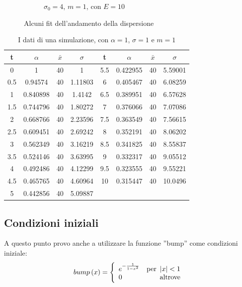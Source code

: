 \begin{figure}[ht]
\begin{subfigure}[b]{0.3\textwidth}
		\caption{$\sigma_0=4$, $m=1$, con $E=10$}
	\end{subfigure}
	\caption{Alcuni fit dell'andamento della dispersione}\label{fig:dispersioneFitE}
\end{figure}

\begin{table}
	\centering
\begin{tabular}{cccc|cccc}
	\toprule
	t	&$\alpha$	&$\bar x$& $\sigma$ &	t	&	$\alpha$	&$\bar x$& $\sigma$\\ \toprule
	0   & 1        & 40 & 1       & 5.5 & 0.422955 & 40 & 5.59001 \\ \midrule
	0.5 & 0.94574  & 40 & 1.11803 & 6   & 0.405467 & 40 & 6.08259 \\ \midrule
	1   & 0.840898 & 40 & 1.4142  & 6.5 & 0.389951 & 40 & 6.57628 \\ \midrule
	1.5 & 0.744796 & 40 & 1.80272 & 7   & 0.376066 & 40 & 7.07086 \\ \midrule
	2   & 0.668766 & 40 & 2.23596 & 7.5 & 0.363549 & 40 & 7.56615 \\ \midrule
	2.5 & 0.609451 & 40 & 2.69242 & 8   & 0.352191 & 40 & 8.06202 \\ \midrule
	3   & 0.562349 & 40 & 3.16219 & 8.5 & 0.341825 & 40 & 8.55837 \\ \midrule
	3.5 & 0.524146 & 40 & 3.63995 & 9   & 0.332317 & 40 & 9.05512 \\ \midrule
	4   & 0.492486 & 40 & 4.12299 & 9.5 & 0.323555 & 40 & 9.55221 \\ \midrule
	4.5 & 0.465765 & 40 & 4.60964 & 10  & 0.315447 & 40 & 10.0496 \\ \midrule
	5   & 0.442856 & 40 & 5.09887 &     &          &    &         \\ \bottomrule
\end{tabular}
\caption{I dati di una simulazione, con $\alpha = 1$, $\sigma=1$ e $m=1$ }\label{table:dispersioneg1}
\end{table}

\subsection{Condizioni iniziali}
A questo punto provo anche a utilizzare la funzione ''bump'' come condizioni iniziale:
\begin{equation}
bump\lrt{x} = \lr\{.{\begin{array}{lr}
e^{-\frac{1}{1-x^2}}&\text{per }\lr||{x}<1\\
0&\text{altrove}
\end{array}}
\end{equation}

